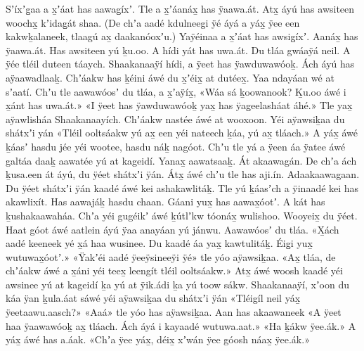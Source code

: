 \begin{pairs}
\begin{Leftside}
Sʼíxʼg̱aa a x̱ʼáat has aawag̱íxʼ.
Tle a x̱ʼáanáx̱ has ÿaawa.át.
Atx̱ áyú has awsiteen woochx̱ kʼidag̱át shaa.
(De chʼa aadé kdulneegi ÿé áyá a yáx̱ ÿee een kakwḵalaneek, tlaagú ax̱ daakanóoxʼu.)
Yaÿéinaa a x̱ʼáat has awsig̱íxʼ.
Aanáx̱ has ÿaawa.át.
Has awsiteen yú ḵu.oo.
A hídi yát has uwa.át.
\pend
\pstart
{}Du tláa gwáaÿá neil.
A ÿée tléil duteen táaych.
Shaakanaaÿí hídi, a ÿeet has ÿawduwawóoḵ.
Ách áyú has aÿaawadlaaḵ.
Chʼáakw has ḵéini áwé du x̱ʼéix̱ at dutéex̱.
Yaa ndayáan wé at sʼaatí.
Chʼu tle aawa\-wóosʼ du tláa, a x̱ʼaÿíx̱,
«\!Wáa sá ḵoowa\-nook?
Ḵu.oo áwé i x̱ánt has uwa.át.\!»
«\!I ÿeet has ÿawduwawóoḵ yax̱ has ÿag̱eelasháat áhé.\!»
Tle yax̱ aÿawlisháa Shaakanaayích.
Chʼáakw nastée áwé at wooxoon.
\pend
\pstart
{}Yéi aÿawsiḵaa du shátxʼi yán
«\!Tléil ooltsáakw yú ax̱ een yéi nateech ḵáa, yú ax̱ tláach.\!»
A yáx̱ áwé ḵáasʼ hasdu jée yéi wootee, hasdu náḵ nagóot.
Chʼu tle yá a ÿeen áa ÿatee áwé galtáa daaḵ aawatée yú at kageidí.
Yanax̱ aawatsaaḵ.
Át akaawagán.
De chʼa ách ḵusa.een át áyú, du ÿéet shátxʼi ÿán.
Átx̱ áwé chʼu tle has aji.ín.
Adaakaawagaan.
Du ÿéet shátxʼi ÿán kaadé áwé kei ashakawlitáḵ.
Tle yú ḵáasʼch a ÿinaadé kei has akawlixít.
Has aawajáḵ hasdu chaan.
Gáani yux̱ has aawa\-x̱óotʼ.
A kát has ḵushakaawaháa.
Chʼa yéi gugéikʼ áwé ḵútlʼkw tóonáx̱ wulishoo.
\pend
\pstart
{}Wooyeix̱ du ÿéet.
Haat góot áwé aa\-tlein áyú ÿaa anayáan yú jánwu.
Aawa\-wóosʼ du tláa.
«\!X̱ách aadé keeneek yé x̱á haa wusinee.
Du kaadé áa yax̱ kawtulitáḵ.
Éig̱i yux̱ wutuwax̱óotʼ.\!»
«\!Ÿakʼéi aadé ÿeeÿsineeÿi ÿé\!»
tle yóo aÿawsiḵaa.
«\!Ax̱ tláa, de chʼáakw áwé a x̱áni yéi teex̱ leengít tléil ooltsáakw.\!»
Atx̱ áwé woosh kaadé yéi awsinee yú at kageidí ḵa yú at ÿik.ádi ḵa yú toow sákw.
\pend
\pstart
{}Shaakanaaÿí, xʼoon du káa ÿan ḵula.áat sáwé yéi aÿawsiḵaa du shátxʼi ÿán
«\!Tléigíl neil yáx̱ ÿeetaawu.aasch?\!»
«\!Aaá\!» tle yóo has aÿawsiḵaa.
Aan has akaawaneek
«\!A ÿeet haa ÿaawawóoḵ ax̱ tláach.
Ách áyá i kayaadé wutuwa.aat.\!»
«\!Ha ḵákw ÿee.ák.\!»
A yáx̱ áwé has a.áak.
«\!Chʼa ÿee yáx̱, déix̱ xʼwán ÿee góosh náax̱ ÿee.ák.\!»

\end{Leftside}
\end{pairs}
